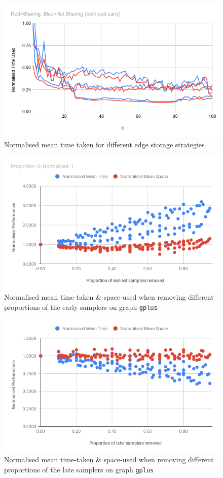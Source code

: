 \documentclass[11pt,twoside,a4paper]{report}
\begin{document}
\begin{figure}
	\label{Figure 4}
  \includegraphics[width=\textwidth]{img/edgeTime.png}
	\caption{Normalised mean time taken for different edge storage strategies}
\end{figure}
\begin{figure}
	\label{Figure 5}
  \includegraphics[width=\textwidth]{img/removedEarlySamplers.png}
	\caption{Normalised mean time-taken \& space-used when removing different proportions of the early samplers on graph \texttt{gplus}}
\end{figure}
\begin{figure}
	\label{Figure 6}
  \includegraphics[width=\textwidth]{img/removedLaterSamplers.png}
	\caption{Normalised mean time-taken \& space-used when removing different proportions of the late samplers on graph \texttt{gplus}}
\end{figure}
\end{document}
